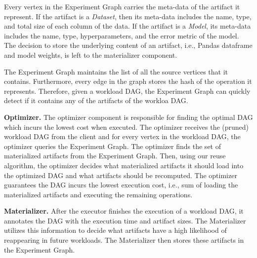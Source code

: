 Every vertex in the Experiment Graph carries the meta-data of the artifact it represent.
If the artifact is a \textit{Dataset}, then its meta-data includes the name, type, and total size of each column of the data.
If the artifact is a \textit{Model}, its meta-data includes the name, type, hyperparameters, and the error metric of the model.
The decision to store the underlying content of an artifact, i.e., Pandas dataframe and model weights, is left to the materializer component.

The Experiment Graph maintains the list of all the source vertices that it contains.
Furthermore, every edge in the graph stores the hash of the operation it represents.
Therefore, given a workload DAG, the Experiment Graph can quickly detect if it contains any of the artifacts of the workloa DAG.

\textbf{Optimizer. }
The optimizer component is responsible for finding the optimal DAG which incurs the lowest cost when executed.
The optimizer receives the (pruned) workload DAG from the client and for every vertex in the workload DAG, the optimizer queries the Experiment Graph.
The optimizer finds the set of materialized artifacts from the Experiment Graph.
Then, using our reuse algorithm, the optimizer decides what materialized artifacts it should load into the optimized DAG and what artifacts should be recomputed.
The optimizer guarantees the DAG incurs the lowest execution cost, i.e., sum of loading the materialized artifacts and executing the remaining operations.

\textbf{Materializer.}
After the executor finishes the execution of a workload DAG, it annotates the DAG with the execution time and artifact sizes.
The Materializer utilizes this information to decide what artifacts have a high likelihood of reappearing in future workloads.
The Materializer then stores these artifacts in the Experiment Graph.


